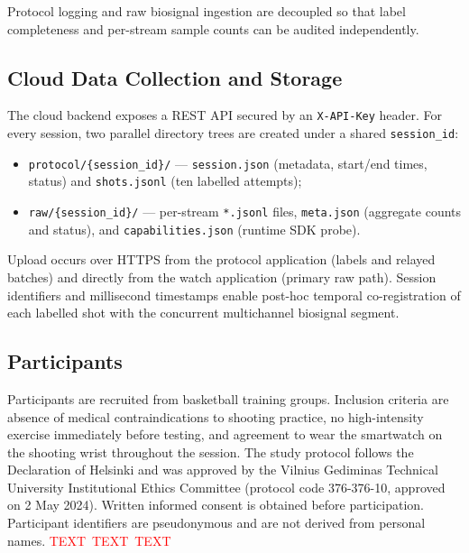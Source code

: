\documentclass[sensors,article,submit,pdftex,moreauthors]{Definitions/mdpi}
\newcommand{\ph}{\textcolor{red}{TEXT}}
\newcommand{\phh}{\ph{}\ \ph{}\ \ph{}}
\begin{document}
Protocol logging and raw biosignal ingestion are decoupled so that label completeness and per-stream sample counts can be audited independently.



\subsection{Cloud Data Collection and Storage}



The cloud backend exposes a REST API secured by an \texttt{X-API-Key} header. For every session, two parallel directory trees are created under a shared \texttt{session\_id}:



\begin{itemize}

\item \texttt{protocol/\{session\_id\}/} --- \texttt{session.json} (metadata, start/end times, status) and \texttt{shots.jsonl} (ten labelled attempts);

\item \texttt{raw/\{session\_id\}/} --- per-stream \texttt{*.jsonl} files, \texttt{meta.json} (aggregate counts and status), and \texttt{capabilities.json} (runtime SDK probe).

\end{itemize}



Upload occurs over HTTPS from the protocol application (labels and relayed batches) and directly from the watch application (primary raw path). Session identifiers and millisecond timestamps enable post-hoc temporal co-registration of each labelled shot with the concurrent multichannel biosignal segment.



\subsection{Participants}



Participants are recruited from basketball training groups. Inclusion criteria are absence of medical contraindications to shooting practice, no high-intensity exercise immediately before testing, and agreement to wear the smartwatch on the shooting wrist throughout the session. The study protocol follows the Declaration of Helsinki and was approved by the Vilnius Gediminas Technical University Institutional Ethics Committee (protocol code 376-376-10, approved on 2 May 2024). Written informed consent is obtained before participation. Participant identifiers are pseudonymous and are not derived from personal names. \phh
\end{document}
